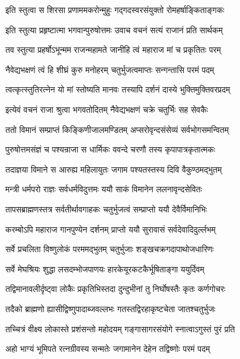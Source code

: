 \twolineshloka
{इति स्तुत्वा स शिरसा प्रणाममकरोन्मुहुः}
{गद्गदस्वरसंयुक्तो रोमहर्षाङ्किताङ्गकः}%

\twolineshloka
{इति स्तुत्या प्रहृष्टात्मा भगवान्पुरुषोत्तमः}
{उवाच वचनं सत्यं राजानं प्रति सार्थकम्}%


\twolineshloka
{तव स्तुत्या प्रहर्षोऽभून्मम राजन्महामते}
{जानीहि त्वं महाराज मां च प्रकृतितः परम्}%

\twolineshloka
{नैवेद्यभक्षणं त्वं हि शीघ्रं कुरु मनोहरम्}
{चतुर्भुजत्वमाप्तः सन्गन्तासि परमं पदम्}%

\twolineshloka
{त्वत्कृत्स्तुतिरत्नेन यो मां स्तोष्यति मानवः}
{तस्यापि दर्शनं दास्ये भुक्तिमुक्तिवरप्रदम्}%

\twolineshloka
{इत्येवं वचनं राजा श्रुत्वा भगवतोदितम्}
{नैवेद्यभक्षणं चक्रे चतुर्भिः सह सेवकैः}%

\twolineshloka
{ततो विमानं सम्प्राप्तं किङ्किणीजालमण्डितम्}
{अप्सरोवृन्दसंसेव्यं सर्वभोगसमन्वितम्}%

\twolineshloka
{पुरुषोत्तमसंज्ञं च पश्यन्राजा स धार्मिकः}
{ववन्दे चरणौ तस्य कृपापात्रकृतात्मकः}%

\twolineshloka
{तदाज्ञया विमाने स आरुह्य महिलायुतः}
{जगाम पश्यतस्तस्य दिवि वैकुण्ठमद्भुतम्}%

\twolineshloka
{मन्त्री धर्मपरो राज्ञः सर्वधर्मविदुत्तमः}
{ययौ साकं विमानेन ललनावृन्दसेवितः}%

\twolineshloka
{तापसब्राह्मणस्तत्र सर्वतीर्थावगाहकः}
{चतुर्भुजत्वं सम्प्राप्तो ययौ देवैर्विमानिभिः}%

\twolineshloka
{करम्बोऽपि महाराज गानपुण्येन दर्शनम्}
{प्राप्तो ययौ सुरावासं सर्वदेवादिदुर्ल्लभम्}%

\twolineshloka
{सर्वे प्रचलिता विष्णुलोकं परममद्भुतम्}
{चतुर्भुजाः शङ्खचक्रगदापाथोजधारिणः}%

\twolineshloka
{सर्वे मेघश्रियः शुद्धा लसदम्भोजपाणयः}
{हारकेयूरकटकैर्भूषिताङ्गा ययुर्दिवम्}%

\twolineshloka
{तद्विमानावलीर्दृष्ट्वा लोकैः प्रकृतिभिस्तदा}
{दुन्दुभीनां तु निर्घोषस्तैः कृतः कर्णगोचरः}%

\twolineshloka
{तदैको ब्राह्मणो ह्यासीद्विष्णुपादाब्जवल्लभः}
{गतस्तद्विरहाकृष्टचेता जातश्चतुर्भुजः}%

\twolineshloka
{तच्चित्रं वीक्ष्य लोकास्ते प्रशंसन्तो महोदयम्}
{गङ्गासागरसंयोगे स्नात्वाऽगुस्तं पुरं प्रति}%

\twolineshloka
{अहो भाग्यं भूमिपते रत्नग्रीवस्य सन्मतेः}
{जगामानेन देहेन तद्विष्णोः परमं पदम्}%

